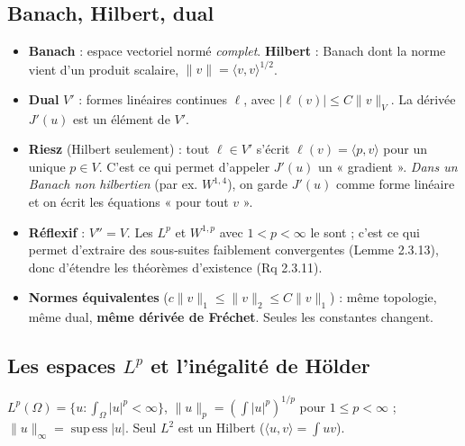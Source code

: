 \documentclass[10pt,a4paper]{article}
\newcommand{\sca}[2]{\langle #1,#2\rangle}
\newcommand{\nr}[1]{\|#1\|}
\begin{document}
\subsection{Banach, Hilbert, dual}
\begin{itemize}
\item \textbf{Banach} : espace vectoriel normé \emph{complet}. \textbf{Hilbert} : Banach dont la norme vient d'un produit scalaire, $\nr v=\sca vv^{1/2}$.
\item \textbf{Dual} $V'$ : formes linéaires continues $\ell$, avec $|\ell(v)|\le C\nr v_V$. La dérivée $J'(u)$ est un élément de $V'$.
\item \textbf{Riesz} (Hilbert seulement) : tout $\ell\in V'$ s'écrit $\ell(v)=\sca pv$ pour un unique $p\in V$. C'est ce qui permet d'appeler $J'(u)$ un « gradient ». \emph{Dans un Banach non hilbertien} (par ex. $W^{1,4}$), on garde $J'(u)$ comme forme linéaire et on écrit les équations « pour tout $v$ ».
\item \textbf{Réflexif} : $V''=V$. Les $L^p$ et $W^{1,p}$ avec $1<p<\infty$ le sont ; c'est ce qui permet d'extraire des sous-suites faiblement convergentes (Lemme 2.3.13), donc d'étendre les théorèmes d'existence (Rq 2.3.11).
\item \textbf{Normes équivalentes} ($c\nr v_1\le\nr v_2\le C\nr v_1$) : même topologie, même dual, \textbf{même dérivée de Fréchet}. Seules les constantes changent.
\end{itemize}

\subsection{Les espaces \texorpdfstring{$L^p$}{Lp} et l'inégalité de Hölder}
$L^p(\Omega)=\{u:\int_\Omega|u|^p<\infty\}$, $\nr u_p=(\int|u|^p)^{1/p}$ pour $1\le p<\infty$ ; $\nr u_\infty=\operatorname{sup\,ess}|u|$. Seul $L^2$ est un Hilbert ($\sca uv=\int uv$).
\end{document}
